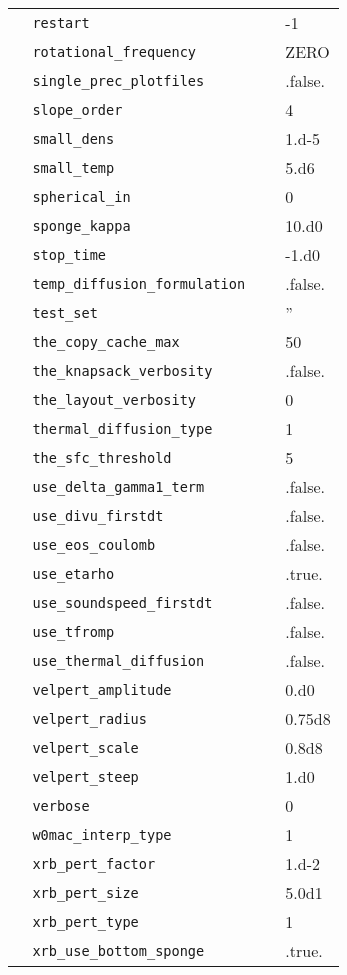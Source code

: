 \begin{center}
\begin{longtable}{|l|p{3.0in}|l|}
\verb=  restart =  &   &  -1  \\
\verb=  rotational_frequency =  &   &  ZERO  \\
\verb=  single_prec_plotfiles =  &   &  .false.  \\
\verb=  slope_order =  &   &  4  \\
\verb=  small_dens =  &   &  1.d-5  \\
\verb=  small_temp =  &   &  5.d6  \\
\verb=  spherical_in =  &   &  0  \\
\verb=  sponge_kappa =  &   &  10.d0  \\
\verb=  stop_time =  &   &  -1.d0  \\
\verb=  temp_diffusion_formulation =  &   &  .false.  \\
\verb=  test_set =  &   & '' \\
\verb=  the_copy_cache_max =  &   &  50  \\
\verb=  the_knapsack_verbosity =  &   &  .false.  \\
\verb=  the_layout_verbosity =  &   &  0  \\
\verb=  thermal_diffusion_type =  &   &  1  \\
\verb=  the_sfc_threshold =  &   &  5  \\
\verb=  use_delta_gamma1_term =  &   &  .false.  \\
\verb=  use_divu_firstdt =  &   &  .false.  \\
\verb=  use_eos_coulomb =  &   &  .false.  \\
\verb=  use_etarho =  &   &  .true.  \\
\verb=  use_soundspeed_firstdt =  &   &  .false.  \\
\verb=  use_tfromp =  &   &  .false.  \\
\verb=  use_thermal_diffusion =  &   &  .false.  \\
\verb=  velpert_amplitude =  &   &  0.d0  \\
\verb=  velpert_radius =  &   &  0.75d8  \\
\verb=  velpert_scale =  &   &  0.8d8  \\
\verb=  velpert_steep =  &   &  1.d0  \\
\verb=  verbose =  &   &  0  \\
\verb=  w0mac_interp_type =  &   &  1  \\
\verb=  xrb_pert_factor =  &   &  1.d-2  \\
\verb=  xrb_pert_size =  &   &  5.0d1  \\
\verb=  xrb_pert_type =  &   &  1  \\
\verb=  xrb_use_bottom_sponge =  &   &  .true.  \\

\end{longtable}
\end{center}
%
